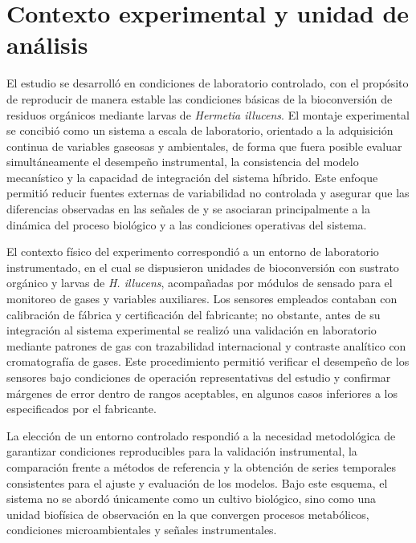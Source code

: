 \section{Contexto experimental y unidad de análisis}

El estudio se desarrolló en condiciones de laboratorio controlado, con el propósito de reproducir de manera estable las condiciones básicas de la bioconversión de residuos orgánicos mediante larvas de \textit{Hermetia illucens}. El montaje experimental se concibió como un sistema a escala de laboratorio, orientado a la adquisición continua de variables gaseosas y ambientales, de forma que fuera posible evaluar simultáneamente el desempeño instrumental, la consistencia del modelo mecanístico y la capacidad de integración del sistema híbrido. Este enfoque permitió reducir fuentes externas de variabilidad no controlada y asegurar que las diferencias observadas en las señales de  y  se asociaran principalmente a la dinámica del proceso biológico y a las condiciones operativas del sistema.

El contexto físico del experimento correspondió a un entorno de laboratorio instrumentado, en el cual se dispusieron unidades de bioconversión con sustrato orgánico y larvas de \textit{H. illucens}, acompañadas por módulos de sensado para el monitoreo de gases y variables auxiliares. Los sensores empleados contaban con calibración de fábrica y certificación del fabricante; no obstante, antes de su integración al sistema experimental se realizó una validación en laboratorio mediante patrones de gas con trazabilidad internacional y contraste analítico con cromatografía de gases. Este procedimiento permitió verificar el desempeño de los sensores bajo condiciones de operación representativas del estudio y confirmar márgenes de error dentro de rangos aceptables, en algunos casos inferiores a los especificados por el fabricante.

La elección de un entorno controlado respondió a la necesidad metodológica de garantizar condiciones reproducibles para la validación instrumental, la comparación frente a métodos de referencia y la obtención de series temporales consistentes para el ajuste y evaluación de los modelos. Bajo este esquema, el sistema no se abordó únicamente como un cultivo biológico, sino como una unidad biofísica de observación en la que convergen procesos metabólicos, condiciones microambientales y señales instrumentales.

